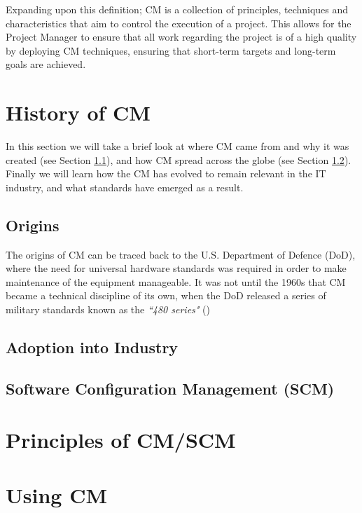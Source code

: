 \documentclass[cmpstyle]{ueacmpstyle}
\begin{document}
		Expanding upon this definition; CM is a collection of principles, techniques and characteristics that aim to control the execution of a project. This allows for the Project Manager to ensure that all work regarding the project is of a high quality by deploying CM techniques, ensuring that short-term targets and long-term goals are achieved.
	
	\section{History of CM} \label{sec:history}
	In this section we will take a brief look at where CM came from and why it was created (see Section \ref{sec:origin}), and how CM spread across the globe (see Section \ref{sec:adoption}). Finally we will learn how the CM has evolved to remain relevant in the IT industry, and what standards have emerged as a result.
	
		\subsection{Origins} \label{sec:origin}
		The origins of CM can be traced back to the U.S. Department of Defence (DoD), where the need for universal hardware standards was required in order to make maintenance of the equipment manageable. It was not until the 1960s that CM became a technical discipline of its own, when the DoD released a series of military standards known as the \emph{``480 series"} (\cite{dod-history})
		
		\subsection{Adoption into Industry} \label{sec:adoption}
		
		\subsection{Software Configuration Management (SCM)} \label{sec:scm}
		
	\section{Principles of CM/SCM} \label{sec:principles}
	
	\section{Using CM} \label{sec:using}
	
\end{document}
